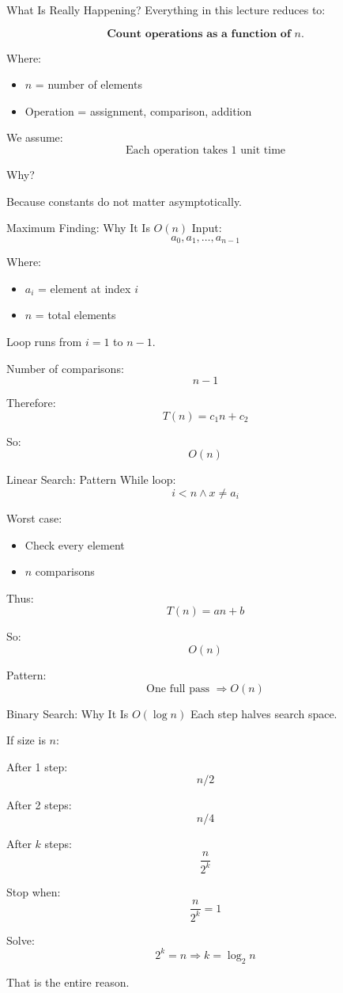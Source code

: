\documentclass[aspectratio=169]{beamer}
\begin{document}
\begin{frame}{What Is Really Happening?}
Everything in this lecture reduces to:

\[
\textbf{Count operations as a function of } n.
\]

Where:
\begin{itemize}
\item $n$ = number of elements
\item Operation = assignment, comparison, addition
\end{itemize}

We assume:
\[
\text{Each operation takes 1 unit time}
\]

Why?  

Because constants do not matter asymptotically.
\end{frame}

\begin{frame}{Maximum Finding: Why It Is $O(n)$}
Input:
\[
a_0, a_1, \dots, a_{n-1}
\]

Where:
\begin{itemize}
\item $a_i$ = element at index $i$
\item $n$ = total elements
\end{itemize}

Loop runs from $i=1$ to $n-1$.

Number of comparisons:
\[
n-1
\]

Therefore:
\[
T(n) = c_1 n + c_2
\]

So:
\[
O(n)
\]
\end{frame}

\begin{frame}{Linear Search: Pattern}
While loop:
\[
i < n \land x \ne a_i
\]

Worst case:
\begin{itemize}
\item Check every element
\item $n$ comparisons
\end{itemize}

Thus:
\[
T(n) = an + b
\]

So:
\[
O(n)
\]

Pattern:
\[
\text{One full pass } \Rightarrow O(n)
\]
\end{frame}

\begin{frame}{Binary Search: Why It Is $O(\log n)$}
Each step halves search space.

If size is $n$:

After 1 step:
\[
n/2
\]

After 2 steps:
\[
n/4
\]

After $k$ steps:
\[
\frac{n}{2^k}
\]

Stop when:
\[
\frac{n}{2^k} = 1
\]

Solve:
\[
2^k = n
\Rightarrow k = \log_2 n
\]

That is the entire reason.
\end{frame}
\end{document}
